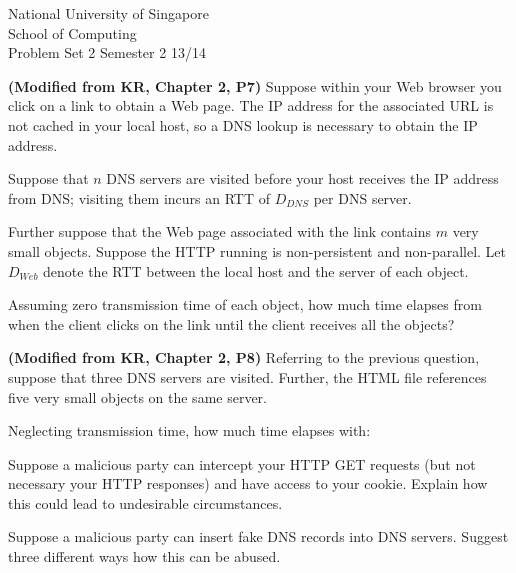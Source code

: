 \documentclass[a4paper,11pt]{exam}
\begin{document}
\extraheadheight{.5in}
%
{\large\sf National University of Singapore\\ School of Computing \\
\LARGE\sf Problem Set 2}%
{\large\sf Semester 2 13/14}
\firstpageheadrule
\pagestyle{headandfoot}

\begin{questions}

\question \textbf{(Modified from KR, Chapter 2, P7)}
Suppose within your Web browser you click on a link to obtain a
Web page.  The IP address for the associated URL is not cached
in your local host, so a DNS lookup is necessary to obtain the
IP address.  

Suppose that $n$ DNS servers are visited before your
host receives the IP address from DNS; visiting them incurs 
an RTT of $D_{DNS}$ per DNS server.

Further suppose that
the Web page associated with the link contains $m$ very small objects. 
Suppose the HTTP running is non-persistent and non-parallel.  Let 
$D_{Web}$
denote the RTT between the local host and the server of each
object.  

Assuming zero transmission time of each object, how
much time elapses from when the client clicks on the link until
the client receives all the objects?

\question \textbf{(Modified from KR, Chapter 2, P8)}
Referring to the previous question, suppose that three DNS servers are visited.  Further, the HTML file
references five very small objects on the same server.

Neglecting transmission time, how much time elapses with:

\question 
Suppose a malicious party can intercept your HTTP GET requests (but not necessary your HTTP responses) and have access to your cookie.  Explain how this could lead to undesirable circumstances.

\question
Suppose a malicious party can insert fake DNS records into DNS servers.  Suggest three different ways how this can be abused.

\end{questions}
\end{document}

